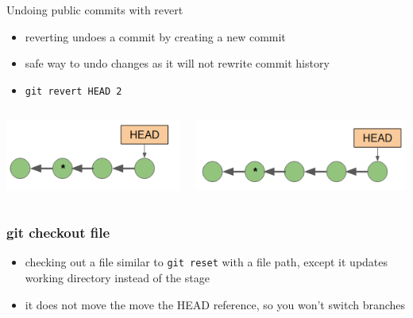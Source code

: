\documentclass[12pt]{beamer}
\begin{document}
\begin{frame}{Undoing public commits with revert}
\begin{itemize}
	\item reverting undoes a commit by creating a new commit
	\item safe way to undo changes as it will not rewrite commit history
	\item \texttt{git revert HEAD~2}
\end{itemize}
\begin{columns}
	\begin{column}{0.5\linewidth}
		\includegraphics[width=\linewidth]{before_revert}
	\end{column}
	\begin{column}{0.5\linewidth}
		\includegraphics[width=\linewidth]{after_revert}
	\end{column}
\end{columns}
\end{frame}

\begin{frame}
\frametitle{git checkout file}
\begin{itemize}
	\item checking out a file similar to \texttt{git reset} with a file path, except it updates working directory instead of the stage
	\item it does not move the move the HEAD reference, so you won't switch branches
\end{itemize}
\end{frame}
\end{document}
